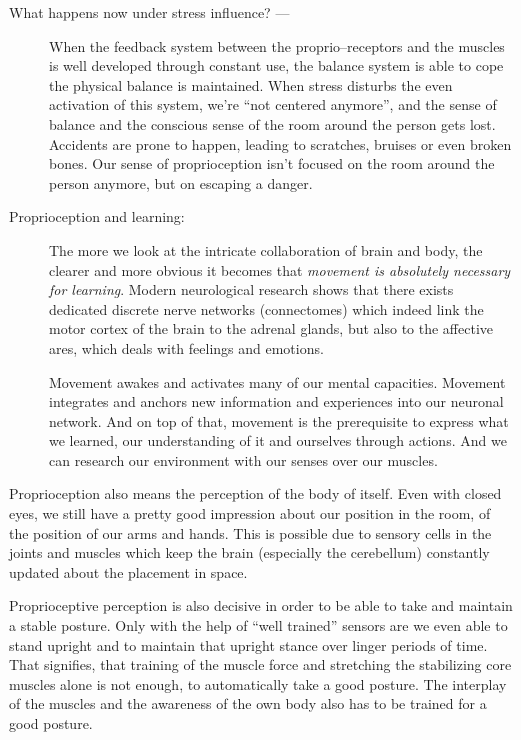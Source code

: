 \documentclass[../main.tex]{subfiles}
\begin{document}
\begin{description}
\item[What happens now under stress influence? ---]
  When the feedback system between the proprio--receptors and the muscles is well developed through constant use, the balance system is able
  to cope the physical balance is maintained.
  When stress disturbs the even activation of this system, we're ``not centered anymore'', and the sense of balance and the conscious sense of the room around the person gets lost.
  Accidents are prone to happen, leading to scratches, bruises or even broken bones.
  Our sense of proprioception isn't focused on the room around the person anymore, but on escaping a danger.
\item[Proprioception and learning:] The more we look at the intricate collaboration of brain and body, the clearer and more obvious it becomes that
  \emph{movement is absolutely necessary for learning}.
  Modern neurological research\cite{Connectome} shows that there exists dedicated discrete nerve networks (connectomes) which indeed link the motor cortex of the brain to the adrenal glands, but also to the affective ares, which deals with feelings and emotions.

  Movement awakes and activates many of our mental capacities.
  Movement integrates and anchors new information and experiences into our neuronal network.
  And on top of that, movement is the prerequisite to express what we learned, our understanding of it and ourselves through actions.
  And we can research our environment with our senses over our muscles.
  
\end{description}

Proprioception also means the perception of the body of itself. Even with closed eyes, we still have a pretty good impression about our position in the room, of the position of our arms and hands.
This is possible due to sensory cells in the joints and muscles which keep the brain (especially the cerebellum) constantly updated about the placement in space.

Proprioceptive perception is also decisive in order to be able to take and maintain a stable posture. Only with the help of ``well trained'' sensors are we even able to stand upright and to maintain that upright stance over linger periods of time.
That signifies, that training of the muscle force and stretching the stabilizing core muscles alone is not enough, to automatically take a good posture.
The interplay of the muscles and the awareness of the own body  also has to be trained for a good posture.
\end{document}
